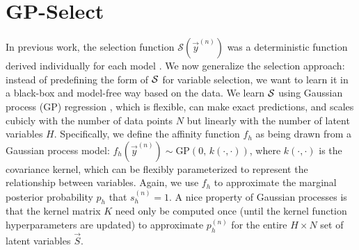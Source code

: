 \section{GP-Select}
\label{gp-select}
%
In previous work, the selection function $\mathcal{S}(\vec{y}^{(n)})$ 
was a deterministic function derived  individually for each model 
\citep[see e.g.][]{SheltonEtAl2011, SheltonEtAl2012, DaiLucke2012a, DaiLucke2012b,
BornscheinEtAl2013, SheikhEtAl2014}.
%
We now generalize the selection approach:  %
instead of predefining the form of $\mathcal{S}$ for variable selection, we want
to learn it in a black-box and model-free way based on the data.
%
We learn $\mathcal{S}$  using Gaussian process (GP) regression
\citep[e.g.][]{RasmussenGPbook}, which is flexible, can make exact predictions,
and scales cubicly with the number of data points $N$ but linearly with the number of latent variables $H$.  
%
%
%
%
Specifically, we define the affinity function $f_h$ as being drawn from a Gaussian process model: 
$f_h(\vec{y}^{(n)}) \sim \text{GP}\left(0, \, k(\cdot,\cdot) \right)$, where $k(\cdot, \cdot)$ is the covariance kernel, 
which can be flexibly parameterized to represent the relationship between variables.
Again, we use $f_h$ to approximate the marginal posterior probability $p_h$ that $s_h^{(n)}=1$.
%
A nice property of Gaussian processes is that the kernel matrix $K$ need only be computed once (until the kernel function hyperparameters are updated) 
to approximate $p_h^{(n)}$ for the entire $H\times N$ set of latent variables $\vec{S}$.

